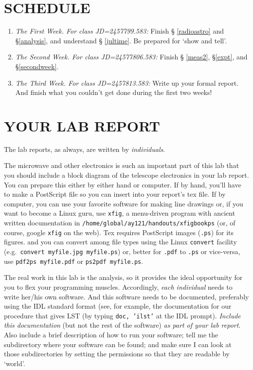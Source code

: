 \documentclass[12pt,preprint]{aastex}
\begin{document}
\section{SCHEDULE}
\begin{enumerate}
\item {\it The First Week. For class JD=2457799.583:} Finish \S
  \ref{radioastro} and \S \ref{analysis}, and understand \S
  \ref{jultime}. Be prepared for `show and tell'.

\item {\it The Second Week. For class JD=24577806.583:} Finish \S
  \ref{meas2}, \S \ref{expt}, and \S \ref{secondweek}. 

\item {\it The Third Week. For class JD=2457813.583:} Write up your formal
  report. And finish what you couldn't get done during the first two
  weeks!
\end{enumerate}

\section{YOUR LAB REPORT}

The lab reports, as always, are written by {\it individuals}. 

The microwave and other electronics is such an important part of this
lab that you should include a block diagram of the telescope electronics
in your lab report. You can prepare this either by either hand or
computer. If by hand, you'll have to make a PostScript file so you can
insert into your report's tex file. If by computer, you can use your
favorite software for making line drawings or, if you want to become a
Linux guru, use {\tt xfig}, a menu-driven program with ancient written
documentation in {\tt /home/global/ay121/handouts/xfigbookps} (or, of
course, google {\tt xfig} on the web). Tex requires PostScript images
({\tt *.ps}) for its figures. and you can convert among file types using
the Linux {\tt convert} facility (e.g.\ {\tt convert myfile.jpg
  myfile.ps}) or, better for {\tt *.pdf} to {\tt *.ps} or vice-versa,
use {\tt pdf2ps myfile.pdf} or {\tt ps2pdf myfile.ps}.

The real work in this lab is the analysis, so it provides the ideal
opportunity for you to flex your programming muscles. Accordingly, {\it
  each individual} needs to write her/his own software. And this
software needs to be documented, preferably using the IDL standard
format (see, for example, the documentation for our procedure that gives
LST (by typing {\tt doc, 'ilst'} at the IDL prompt). {\it Include this
  documentation} (but not the rest of the software) {\it as part of your lab
report}. Also include a brief description of how to run your software;
tell me the subdirectory where your software can be found; and make sure
I can look at those subdirectories by setting the permissions so that
they are readable by `world'. 
\end{document}
